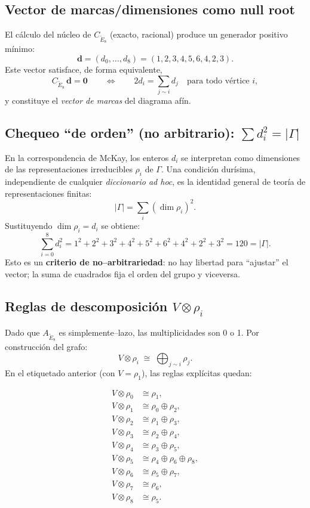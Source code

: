 \documentclass[11pt,a4paper]{article}
\theoremstyle{definition}
\theoremstyle{remark}
\begin{document}
\subsection{Vector de marcas/dimensiones como null root}
El cálculo del núcleo de $C_{\widetilde{E}_8}$ (exacto, racional) produce un generador positivo mínimo:
\[
\bm d=(d_0,\dots,d_8)=(1,2,3,4,5,6,4,2,3).
\]
Este vector satisface, de forma equivalente,
\[
C_{\widetilde{E}_8}\,\bm d=\bm 0
\qquad\Longleftrightarrow\qquad
2d_i=\sum_{j\sim i} d_j\quad\text{para todo vértice }i,
\]
y constituye el \emph{vector de marcas} del diagrama afín.

\subsection{Chequeo ``de orden'' (no arbitrario): $\sum d_i^2 = |\Gamma|$}
En la correspondencia de McKay, los enteros $d_i$ se interpretan como dimensiones de las representaciones irreducibles $\rho_i$ de $\Gamma$.
Una condición durísima, independiente de cualquier \emph{diccionario ad hoc}, es la identidad general de teoría de representaciones finitas:
\[
|\Gamma|=\sum_{i} (\dim\rho_i)^2.
\]
Sustituyendo $\dim\rho_i=d_i$ se obtiene:
\[
\sum_{i=0}^8 d_i^2 = 1^2+2^2+3^2+4^2+5^2+6^2+4^2+2^2+3^2 = 120 = |\Gamma|.
\]
Esto es un \textbf{criterio de no--arbitrariedad}: no hay libertad para ``ajustar'' el vector;
la suma de cuadrados fija el orden del grupo y viceversa.

\subsection{Reglas de descomposición $V\otimes\rho_i$}
Dado que $A_{\widetilde{E}_8}$ es simplemente--lazo, las multiplicidades son 0 o 1.
Por construcción del grafo:
\[
V\otimes \rho_i \;\cong\; \bigoplus_{j\sim i}\rho_j.
\]
En el etiquetado anterior (con $V=\rho_1$), las reglas explícitas quedan:

\begin{align*}
V\otimes\rho_0 &\cong \rho_1,\\
V\otimes\rho_1 &\cong \rho_0\oplus \rho_2,\\
V\otimes\rho_2 &\cong \rho_1\oplus \rho_3,\\
V\otimes\rho_3 &\cong \rho_2\oplus \rho_4,\\
V\otimes\rho_4 &\cong \rho_3\oplus \rho_5,\\
V\otimes\rho_5 &\cong \rho_4\oplus \rho_6\oplus \rho_8,\\
V\otimes\rho_6 &\cong \rho_5\oplus \rho_7,\\
V\otimes\rho_7 &\cong \rho_6,\\
V\otimes\rho_8 &\cong \rho_5.
\end{align*}
\end{document}
